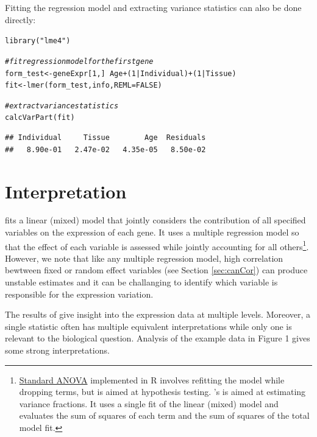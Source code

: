 \documentclass[12pt]{article}\usepackage[]{graphicx}\usepackage[]{xcolor}
\newcommand{\hlnum}[1]{\textcolor[rgb]{0.816,0.125,0.439}{#1}}%
\newcommand{\hlstr}[1]{\textcolor[rgb]{0.251,0.627,0.251}{#1}}%
\newcommand{\hlcom}[1]{\textcolor[rgb]{0.502,0.502,0.502}{\textit{#1}}}%
\newcommand{\hlopt}[1]{\textcolor[rgb]{0,0,0}{#1}}%
\newcommand{\hlstd}[1]{\textcolor[rgb]{0.251,0.251,0.251}{#1}}%
\newcommand{\hlkwb}[1]{\textcolor[rgb]{0,0,0}{#1}}%
\newcommand{\hlkwc}[1]{\textcolor[rgb]{0.251,0.251,0.251}{#1}}%
\newcommand{\hlkwd}[1]{\textcolor[rgb]{0.878,0.439,0.125}{#1}}%
\newenvironment{knitrout}{}{} %
\begin{document}
Fitting the regression model and extracting variance statistics can also be done directly:
\begin{knitrout}
\color{fgcolor}\begin{kframe}
\begin{alltt}
\hlkwd{library}\hlstd{(}\hlstr{"lme4"}\hlstd{)}

\hlcom{# fit regression model for the first gene}
\hlstd{form_test} \hlkwb{<-} \hlstd{geneExpr[}\hlnum{1}\hlstd{, ]} \hlopt{~} \hlstd{Age} \hlopt{+} \hlstd{(}\hlnum{1} \hlopt{|} \hlstd{Individual)} \hlopt{+} \hlstd{(}\hlnum{1} \hlopt{|} \hlstd{Tissue)}
\hlstd{fit} \hlkwb{<-} \hlkwd{lmer}\hlstd{(form_test, info,} \hlkwc{REML} \hlstd{=} \hlnum{FALSE}\hlstd{)}

\hlcom{# extract variance statistics}
\hlkwd{calcVarPart}\hlstd{(fit)}
\end{alltt}
\begin{verbatim}
## Individual     Tissue        Age  Residuals 
##   8.90e-01   2.47e-02   4.35e-05   8.50e-02
\end{verbatim}
\end{kframe}
\end{knitrout}

\pagebreak
\section{Interpretation}

 fits a linear (mixed) model that jointly considers the contribution of all specified variables on the expression of each gene.  It uses a multiple regression model so that the effect of each variable is assessed while jointly accounting for all others\footnote{\href{https://www.r-bloggers.com/2011/03/anova-–-type-iiiiii-ss-explained/}{Standard ANOVA} implemented in R involves refitting the model while dropping terms, but is aimed at hypothesis testing.  's  is aimed at estimating variance fractions.  It uses a single fit of the linear (mixed) model and evaluates the sum of squares of each term and the sum of squares of the total model fit.}. However, we note that like any multiple regression model, high correlation bewtween fixed or random effect variables (see Section \ref{sec:canCor}) can produce unstable estimates and it can be challanging to identify which variable is responsible for the expression variation.

The results of  give insight into the expression data at multiple levels.  Moreover, a single statistic often has multiple equivalent interpretations while only one is relevant to the biological question.  Analysis of the example data in Figure 1 gives some strong interpretations. 
\end{document}
